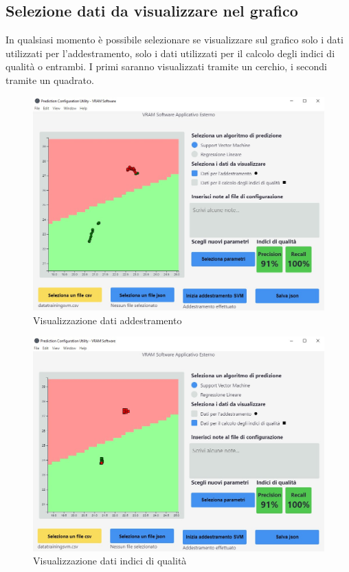 	\subsection{Selezione dati da visualizzare nel grafico}
	In qualsiasi momento è possibile selezionare se visualizzare sul grafico solo i dati utilizzati per l'addestramento, solo i dati utilizzati per il calcolo degli indici di qualità o entrambi. I primi saranno visualizzati tramite un cerchio, i secondi tramite un quadrato.
	\begin{figure}[H] 	
		\begin{center}
			\includegraphics[width=\linewidth]{img/6.jpg}
		\end{center}
		\caption{Visualizzazione dati addestramento}	
	\end{figure}
	\begin{figure}[H] 	
		\begin{center}
			\includegraphics[width=\linewidth]{img/8.jpg}
		\end{center}
		\caption{Visualizzazione dati indici di qualità}	
	\end{figure}

